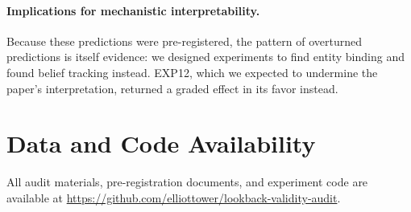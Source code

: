 \documentclass{article}
\begin{document}
\paragraph{Implications for mechanistic interpretability.}
Because these predictions were pre-registered, the pattern of overturned predictions is itself evidence: we designed experiments to find entity binding and found belief tracking instead. EXP12, which we expected to undermine the paper's interpretation, returned a graded effect in its favor instead.


\section*{Data and Code Availability}

All audit materials, pre-registration documents, and experiment code are available at \url{https://github.com/elliottower/lookback-validity-audit}.



\end{document}
